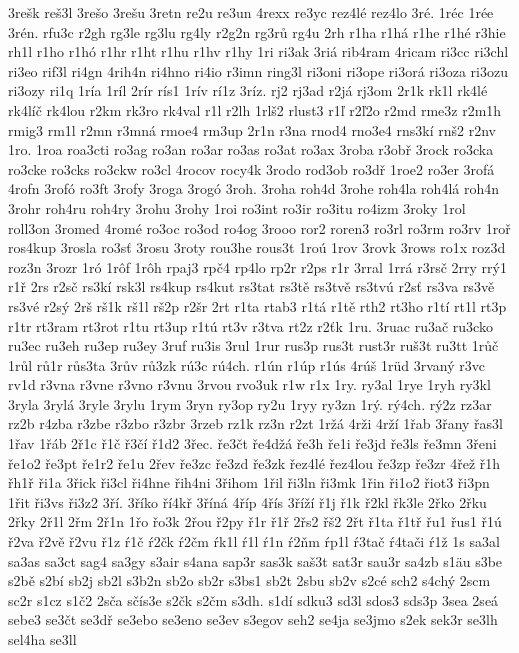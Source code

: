 {3rešk
reš3l
3rešo
3rešu
3retn
re2u
re3un
4rexx
re3yc
rez4lé
rez4lo
3ré.
1réc
1rée
3rén.
rfu3c
r2gh
rg3le
rg3lu
rg4ly
r2g2n
rg3rů
rg4u
2rh
r1ha
r1há
r1he
r1hé
r3hie
rh1l
r1ho
r1hó
r1hr
r1ht
r1hu
r1hv
r1hy
1ri
ri3ak
3riá
rib4ram
4ricam
ri3cc
ri3chl
ri3eo
rif3l
ri4gn
4rih4n
ri4hno
ri4io
r3imn
ring3l
ri3oni
ri3ope
ri3orá
ri3oza
ri3ozu
ri3ozy
ri1q
1ría
1ríl
2rír
rís1
1rív
rí1z
3ríz.
rj2
rj3ad
r2já
rj3om
2r1k
rk1l
rk4lé
rk4líč
rk4lou
r2km
rk3ro
rk4val
r1l
r2lh
1rlš2
rlust3
r1ľ
r2ľ2o
r2md
rme3z
r2m1h
rmig3
rm1l
r2mn
r3mná
rmoe4
rm3up
2r1n
r3na
rnod4
rno3e4
rns3kí
rnš2
r2nv
1ro.
1roa
roa3cti
ro3ag
ro3an
ro3ar
ro3as
ro3at
ro3ax
3roba
r3obř
3rock
ro3cka
ro3cke
ro3cks
ro3ckw
ro3cl
4rocov
rocy4k
3rodo
rod3ob
ro3dř
1roe2
ro3er
3rofá
4rofn
3rofó
ro3ft
3rofy
3roga
3rogó
3roh.
3roha
roh4d
3rohe
roh4la
roh4lá
roh4n
3rohr
roh4ru
roh4ry
3rohu
3rohy
1roi
ro3int
ro3ir
ro3itu
ro4izm
3roky
1rol
roll3on
3romed
4romé
ro3oc
ro3od
ro4og
3rooo
ror2
roren3
ro3rl
ro3rm
ro3rv
1roř
ros4kup
3rosla
ro3sť
3rosu
3roty
rou3he
rous3t
1roú
1rov
3rovk
3rows
ro1x
roz3d
roz3n
3rozr
1ró
1rôf
1rôh
rpaj3
rpč4
rp4lo
rp2r
r2ps
r1r
3rral
1rrá
r3rsč
2rry
rrý1
r1ř
2rs
r2sč
rs3kí
rsk3l
rs4kup
rs4kut
rs3tat
rs3tě
rs3tvě
rs3tvú
r2sť
rs3va
rs3vě
rs3vé
r2sý
2rš
rš1k
rš1l
rš2p
r2šr
2rt
r1ta
rtab3
r1tá
r1tě
rth2
rt3ho
r1tí
rt1l
rt3p
r1tr
rt3ram
rt3rot
r1tu
rt3up
r1tú
rt3v
r3tva
rt2z
r2ťk
1ru.
3ruac
ru3ač
ru3cko
ru3ec
ru3eh
ru3ep
ru3ey
3ruf
ru3is
3rul
1rur
rus3p
rus3t
rust3r
ruš3t
ru3tt
1růč
1růl
rů1r
růs3ta
3rův
rů3zk
rú3c
rú4ch.
r1ún
r1úp
r1ús
4rúš
1rüd
3rvaný
r3vc
rv1d
r3vna
r3vne
r3vno
r3vnu
3rvou
rvo3uk
r1w
r1x
1ry.
ry3al
1rye
1ryh
ry3kl
3ryla
3rylá
3ryle
3rylu
1rym
3ryn
ry3op
ry2u
1ryy
ry3zn
1rý.
rý4ch.
rý2z
rz3ar
rz2b
r4zba
r3zbe
r3zbo
r3zbr
3rzeb
rz1k
rz3n
r2zt
1ržá
4rži
4rží
1řab
3řany
řas3l
1řav
1řáb
2ř1c
ř1č
ř3čí
ř1d2
3řec.
ře3čt
ře4džá
ře3h
ře1i
ře3jd
ře3ls
ře3mn
3řeni
ře1o2
ře3pt
ře1r2
ře1u
2řev
ře3zc
ře3zd
ře3zk
řez4lé
řez4lou
ře3zp
ře3zr
4řež
ř1h
řh1ř
ři1a
3řick
ři3cl
ři4hne
řih4ni
3řihom
1řil
ři3ln
ři3mk
1řin
ři1o2
řiot3
ři3pn
1řit
ři3vs
ři3z2
3ří.
3říko
ří4kř
3říná
4říp
4řís
3říží
ř1j
ř1k
ř2kl
řk3le
2řko
2řku
2řky
2ř1l
2řm
2ř1n
1řo
řo3k
2řou
ř2py
ř1r
ř1ř
2řs2
řš2
2řt
ř1ta
ř1tř
řu1
řus1
ř1ú
ř2va
ř2vě
ř2vu
ř1z
ŕ1č
ŕ2čk
ŕ2čm
ŕk1l
ŕ1l
ŕ1n
ŕ2ňm
ŕp1l
ŕ3tač
ŕ4tači
ŕ1ž
1s
sa3al
sa3as
sa3ct
sag4
sa3gy
s3air
s4ana
sap3r
sas3k
saš3t
sat3r
sau3r
sa4zb
s1äu
s3be
s2bě
s2bí
sb2j
sb2l
s3b2n
sb2o
sb2r
s3bs1
sb2t
2sbu
sb2v
s2cé
sch2
s4chý
2scm
sc2r
s1cz
s1č2
2sča
sčís3e
s2čk
s2čm
s3dh.
s1dí
sdku3
sd3l
sdos3
sds3p
3sea
2seá
sebe3
se3čt
se3dř
se3ebo
se3eno
se3ev
s3egov
seh2
se4ja
se3jmo
s2ek
sek3r
se3lh
sel4ha
se3ll
}
